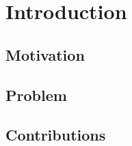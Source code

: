 \chapter{Introduction}\label{C:intro}
\section{Motivation}

\section{Problem}

\section{Contributions}